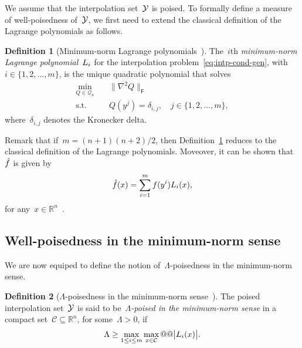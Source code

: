 \documentclass{article}
\numberwithin{equation}{section}
\theoremstyle{definition}
\newtheorem{definition}{Definition}[section]
\theoremstyle{plain}
\theoremstyle{remark}
\newcommand*{\abs}[2][]{#1\lvert#2#1\rvert}
\newcommand*{\lagp}[1][]{L\ifblank{#1}{}{_{#1}}}
\newcommand*{\norm}[2][]{#1\lVert#2#1\rVert}
\newcommand*{\obj}{f}
\newcommand*{\objm}[1][]{\hat{\obj}\ifblank{#1}{}{^{#1}}}
\newcommand*{\qpoly}{\mathcal{Q}_n}
\newcommand*{\R}{\mathbb{R}}
\newcommand*{\set}[2][]{#1\{#2#1\}}
\newcommand*{\xpt}[1][]{\mathcal{Y}\ifblank{#1}{}{^{#1}}}
\begin{document}
We assume that the interpolation set~$\xpt$ is poised.
To formally define a measure of well-poisedness of~$\xpt$, we first need to extend the classical definition of the Lagrange polynomials as follows.

\begin{definition}[Minimum-norm Lagrange polynomials~{\cite[Definition~5.1]{Conn_Scheinberg_Vicente_2009}}]
    \label{def:min-norm-lagp}
    The~$i$th \emph{minimum-norm Lagrange polynomial}~$\lagp[i]$ for the interpolation problem~\eqref{eq:intp-cond-gen}, with~$i \in \set{1, 2, \dots, m}$, is the unique quadratic polynomial that solves
    \begin{equation*}
        \begin{aligned}
            \min_{Q \in \qpoly} & \quad \norm[\big]{\nabla^2 Q}_{\mathsf{F}}\\
            \text{s.t.}         & \quad Q(y^j) = \delta_{i, j}, \quad j \in \set{1, 2, \dots, m},
        \end{aligned}
    \end{equation*}
    where~$\delta_{i, j}$ denotes the Kronecker delta.
\end{definition}

Remark that if~$m = (n + 1) (n + 2) / 2$, then Definition~\ref{def:min-norm-lagp} reduces to the classical definition of the Lagrange polynomials.
Moveover, it can be shown that~$\objm$ is given by
\begin{equation*}
    \objm(x) = \sum_{i = 1}^m \obj(y^i) \lagp[i](x),
\end{equation*}
for any~$x \in \R^n$~\cite[Lemma~5.2]{Conn_Scheinberg_Vicente_2009}.

\subsection{Well-poisedness in the minimum-norm sense}

We are now equiped to define the notion of~$\Lambda$-poisedness in the minimum-norm sense.

\begin{definition}[$\Lambda$-poisedness in the minimum-norm sense~{\cite[Definition~5.6]{Conn_Scheinberg_Vicente_2009}}]
    \label{def:lambda-p}
    The poised interpolation set~$\xpt$ is said to be~\emph{$\Lambda$-poised in the minimum-norm sense} in a compact set~$\mathcal{C} \subseteq \R^n$, for some~$\Lambda > 0$, if
    \begin{equation*}
        \Lambda \ge \max_{1 \le i \le m} \max_{x \in \mathcal{C}} @@ \abs[\big]{\lagp[i](x)}.
    \end{equation*}
\end{definition}
\end{document}
